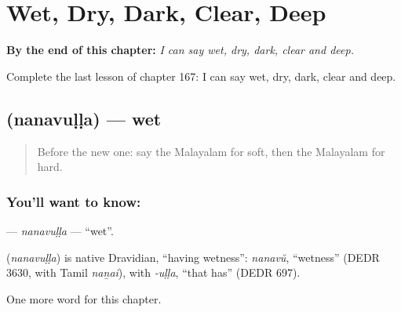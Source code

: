 
\chapter{Wet, Dry, Dark, Clear, Deep}
\label{ch:ml-wet-dry-dark-clear-deep}

\begin{chapteropening}
\textbf{By the end of this chapter:} \emph{I can say wet, dry, dark, clear and deep.}

Complete the last lesson of chapter 167: I can say wet, dry, dark, clear and deep.
\end{chapteropening}

\section[\texorpdfstring{\ml{നനവുള്ള} (nanavuḷḷa)}{നനവുള്ള (nanavuḷḷa)}]{ (nanavuḷḷa) — wet}

\label{lesson:ML-C167-nanavulla}



\begin{quote}
Before the new one: say the Malayalam for soft, then the Malayalam for hard.
\end{quote}

\subsection*{You'll want to know: }
\textbf{} — \emph{nanavuḷḷa} — \textquotedblleft{}wet\textquotedblright{}.

\begin{cousinweb}
\textbf{} (\emph{nanavuḷḷa}) is native Dravidian, \textquotedblleft{}having wetness\textquotedblright{}: \emph{nanavŭ}, \textquotedblleft{}wetness\textquotedblright{} (DEDR 3630, with Tamil \emph{naṉai}), with \emph{-uḷḷa}, \textquotedblleft{}that has\textquotedblright{} (DEDR 697).
\end{cousinweb}

\begin{grammarlens}[title={What you've built}]
One more word for this chapter.
\end{grammarlens}

